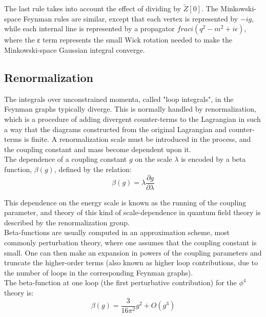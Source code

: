 The last rule takes into account the effect of dividing by $\tilde{Z}[0]$. The Minkowski-space Feynman rules are similar, except that each vertex is represented by $-ig$, while each internal line is represented by a propagator $frac{i}{(q^2-m^2 + i\epsilon)}$, where the ε term represents the small Wick rotation needed to make the Minkowski-space Gaussian integral converge.\\

\subsection{Renormalization}

The integrals over unconstrained momenta, called "loop integrals", in the Feynman graphs typically diverge. This is normally handled by renormalization, which is a procedure of adding divergent counter-terms to the Lagrangian in such a way that the diagrams constructed from the original Lagrangian and counter-terms is finite. A renormalization scale must be introduced in the process, and the coupling constant and mass become dependent upon it.\\

The dependence of a coupling constant $g$ on the scale $\lambda$ is encoded by a beta function, $\beta(g)$, defined by the relation:\\

\begin{equation}
    \beta(g) = \lambda\frac{\partial g}{\partial \lambda}
\end{equation}

This dependence on the energy scale is known as the running of the coupling parameter, and theory of this kind of scale-dependence in quantum field theory is described by the renormalization group.\\

Beta-functions are usually computed in an approximation scheme, most commonly perturbation theory, where one assumes that the coupling constant is small. One can then make an expansion in powers of the coupling parameters and truncate the higher-order terms (also known as higher loop contributions, due to the number of loops in the corresponding Feynman graphs).\\

The beta-function at one loop (the first perturbative contribution) for the $\phi^4$ theory is:\\

\begin{equation}
    \beta(g)=\frac{3}{16\pi^2}g^2+O(g^3)
\end{equation}


